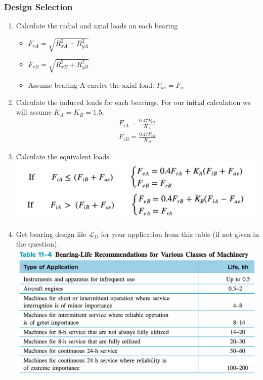 \documentclass[11pt, fleqn]{article}
\begin{document}
\subsubsection{Design Selection}
\begin{enumerate}
    \item Calculate the radial and axial loads on each bearing
    \begin{itemize}
        \item $F_{rA} = \sqrt{R_{xA}^2+R_{yA}^2}$
        \item $F_{rB} = \sqrt{R_{xB}^2+R_{yB}^2}$
        \item Assume bearing A carries the axial load: $F_{ae} = F_a$
    \end{itemize}
    \item Calculate the induced loads for each bearings. For our initial calculation we will assume $K_A=K_B=1.5$.
    \begin{align*}
        F_{iA}=\frac{0.47F_{rA}}{K_A}\\
        F_{iB}=\frac{0.47F_{rB}}{K_B}
    \end{align*}
    \item Calculate the equivalent loads.\\
    \includegraphics[scale=0.6]{Bearings/formulae.png}
    \item Get bearing design life $\mathscr{L}_D$ for your application from this table (if not given in the question):\\
    \includegraphics[scale=0.5]{Bearings/bearing-life.png}

\end{enumerate}
\end{document}
